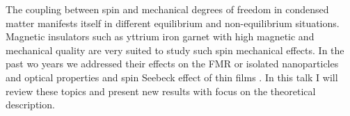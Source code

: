 The coupling between spin and mechanical degrees of freedom in condensed matter manifests itself in different equilibrium and non-equilibrium situations. Magnetic insulators such as yttrium iron garnet with high magnetic and mechanical quality are very suited to study such spin mechanical effects. In the past wo years we addressed their effects on the FMR or isolated nanoparticles \cite{Keshtgar_2017} and optical properties \cite{Shen_2015,Hashimoto_2017} and spin Seebeck effect of thin films \cite{Kikkawa_2016,Flebus_2017,Cornelissen_2017,Cornelissen_2016}.
In this talk I will review these topics and present new results with focus on the theoretical description.